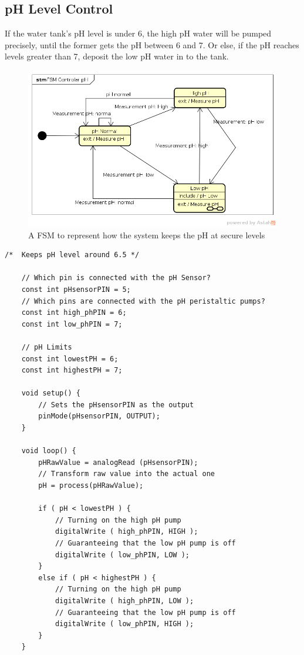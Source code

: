 \subsection{pH Level Control}
    If the water tank's pH level is under 6,
    the high pH water will be pumped precisely,
    until the former gets the pH between 6 and 7.
    Or else,
    if the pH reaches levels greater than 7,
    deposit the low pH water in to the tank.

\begin{figure}[h]
    \centering
    \includegraphics[width=.7\textwidth]{diagrams/pH_Control}
    \caption{A FSM to represent how the system keeps the pH at secure levels}
    \label{fig:fsm_pHc}
\end{figure}

\begin{Code}
    \centering
    \begin{lstlisting}[style=Arduino, caption=pH Control First Code, label=lst:ph1]
    /*  Keeps pH level around 6.5 */

    // Which pin is connected with the pH Sensor?
    const int pHsensorPIN = 5;
    // Which pins are connected with the pH peristaltic pumps?
    const int high_phPIN = 6;
    const int low_phPIN = 7;

    // pH Limits
    const int lowestPH = 6;
    const int highestPH = 7;

    void setup() {
        // Sets the pHsensorPIN as the output
        pinMode(pHsensorPIN, OUTPUT);
    }

    void loop() {
        pHRawValue = analogRead (pHsensorPIN);
        // Transform raw value into the actual one
        pH = process(pHRawValue);

        if ( pH < lowestPH ) {
            // Turning on the high pH pump
            digitalWrite ( high_phPIN, HIGH );
            // Guaranteeing that the low pH pump is off
            digitalWrite ( low_phPIN, LOW );
        }
        else if ( pH < highestPH ) {
            // Turning on the high pH pump
            digitalWrite ( high_phPIN, LOW );
            // Guaranteeing that the low pH pump is off
            digitalWrite ( low_phPIN, HIGH );
        }
    }
    \end{lstlisting}
\end{Code}

